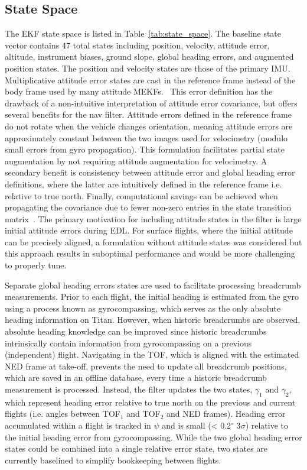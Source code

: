 \subsection{State Space}

The \ac{EKF} state space is listed in Table~\ref{tab:state_space}. The baseline state vector contains 47 total states including position, velocity, attitude error, altitude, instrument biases, ground slope, global heading errors, and augmented position states. The position and velocity states are those of the primary \ac{IMU}. Multiplicative attitude error states are cast in the reference frame instead of the body frame used by many attitude \acp{MEKF}.~\cite{martin2010generalized, carpenter2018, markley} This error definition has the drawback of a non-intuitive interpretation of attitude error covariance, but offers several benefits for the nav filter. Attitude errors defined in the reference frame do not rotate when the vehicle changes orientation, meaning attitude errors are approximately constant between the two images used for velocimetry (modulo small errors from gyro propagation). This formulation facilitates partial state augmentation by not requiring attitude augmentation for velocimetry. A secondary benefit is consistency between attitude error and global heading error definitions, where the latter are intuitively defined in the reference frame i.e. relative to true north. Finally, computational savings can be achieved when propagating the covariance due to fewer non-zero entries in the state transition matrix~\cite{zanettiOrion}. The primary motivation for including attitude states in the filter is large initial attitude errors during \ac{EDL}. For surface flights, where the initial attitude can be precisely aligned, a formulation without attitude states was considered but this approach results in suboptimal performance and would be more challenging to properly tune. 

Separate global heading errors states are used to facilitate processing breadcrumb measurements. Prior to each flight, the initial heading is estimated from the gyro using a process known as gyrocompassing\cite{savage2000strapdown}, which serves as the only absolute heading information on Titan. However, when historic breadcrumbs are observed, absolute heading knowledge can be improved since historic breadcrumbs intrinsically contain information from gyrocompassing on a previous (independent) flight.  Navigating in the \ac{TOF}, which is aligned with the estimated \ac{NED} frame at take-off, prevents the need to update all breadcrumb positions, which are saved in an offline database, every time a historic breadcrumb measurement is processed. Instead, the filter updates the two states, $\gamma_{1}$ and $\gamma_{2}$, which represent heading error relative to true north on the previous and current flights (i.e. angles between \ac{TOF}$_{1}$ and \ac{TOF}$_{2}$ and \ac{NED} frames). Heading error accumulated within a flight is tracked in $\psi$ and is small (< 0.2$^\circ$ 3$\sigma$) relative to the initial heading error from gyrocompassing. While the two global heading error states could be combined into a single relative error state, two states are currently baselined to simplify bookkeeping between flights.

